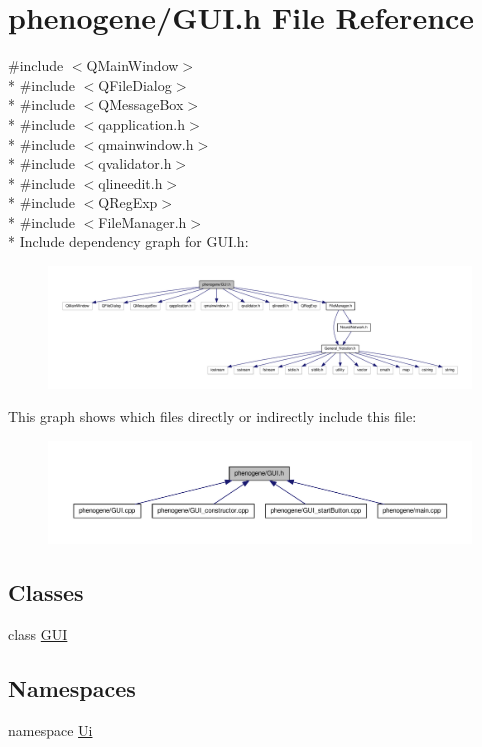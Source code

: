\hypertarget{a00010}{\section{phenogene/\-G\-U\-I.h File Reference}
\label{d7/dec/a00010}
}
{\ttfamily \#include $<$Q\-Main\-Window$>$}\\*
{\ttfamily \#include $<$Q\-File\-Dialog$>$}\\*
{\ttfamily \#include $<$Q\-Message\-Box$>$}\\*
{\ttfamily \#include $<$qapplication.\-h$>$}\\*
{\ttfamily \#include $<$qmainwindow.\-h$>$}\\*
{\ttfamily \#include $<$qvalidator.\-h$>$}\\*
{\ttfamily \#include $<$qlineedit.\-h$>$}\\*
{\ttfamily \#include $<$Q\-Reg\-Exp$>$}\\*
{\ttfamily \#include $<$File\-Manager.\-h$>$}\\*
Include dependency graph for G\-U\-I.\-h\-:
\nopagebreak
\begin{figure}[H]
\begin{center}
\leavevmode
\includegraphics[width=350pt]{d5/d16/a00029}
\end{center}
\end{figure}
This graph shows which files directly or indirectly include this file\-:
\nopagebreak
\begin{figure}[H]
\begin{center}
\leavevmode
\includegraphics[width=350pt]{d5/d79/a00030}
\end{center}
\end{figure}
\subsection*{Classes}
\begin{DoxyCompactItemize}
\item 
class \hyperlink{a00002}{G\-U\-I}
\end{DoxyCompactItemize}
\subsection*{Namespaces}
\begin{DoxyCompactItemize}
\item 
namespace \hyperlink{a00020}{Ui}
\end{DoxyCompactItemize}

